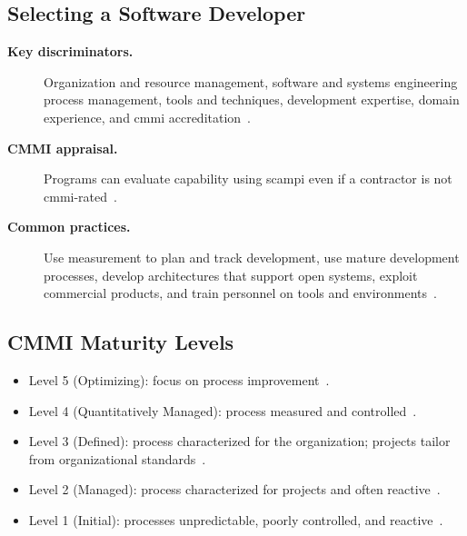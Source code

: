 \documentclass[../main.tex]{subfiles}
\begin{document}
\subsection{Selecting a Software Developer}
\begin{description}
  \item[\textbf{Key discriminators.}] Organization and resource management, software and systems engineering process management, tools and techniques, development expertise, domain experience, and \ac{cmmi} accreditation~\autocite{edo-3-4-2-software-acquisition-management-2025}.
  \item[\textbf{CMMI appraisal.}] Programs can evaluate capability using \ac{scampi} even if a contractor is not \ac{cmmi}-rated~\autocite{edo-3-4-2-software-acquisition-management-2025}.
  \item[\textbf{Common practices.}] Use measurement to plan and track development, use mature development processes, develop architectures that support open systems, exploit commercial products, and train personnel on tools and environments~\autocite{edo-3-4-2-software-acquisition-management-2025}.
\end{description}

\subsection{CMMI Maturity Levels}
\begin{itemize}
  \item Level 5 (Optimizing): focus on process improvement~\autocite{edo-3-4-2-software-acquisition-management-2025}.
  \item Level 4 (Quantitatively Managed): process measured and controlled~\autocite{edo-3-4-2-software-acquisition-management-2025}.
  \item Level 3 (Defined): process characterized for the organization; projects tailor from organizational standards~\autocite{edo-3-4-2-software-acquisition-management-2025}.
  \item Level 2 (Managed): process characterized for projects and often reactive~\autocite{edo-3-4-2-software-acquisition-management-2025}.
  \item Level 1 (Initial): processes unpredictable, poorly controlled, and reactive~\autocite{edo-3-4-2-software-acquisition-management-2025}.
\end{itemize}
\end{document}
